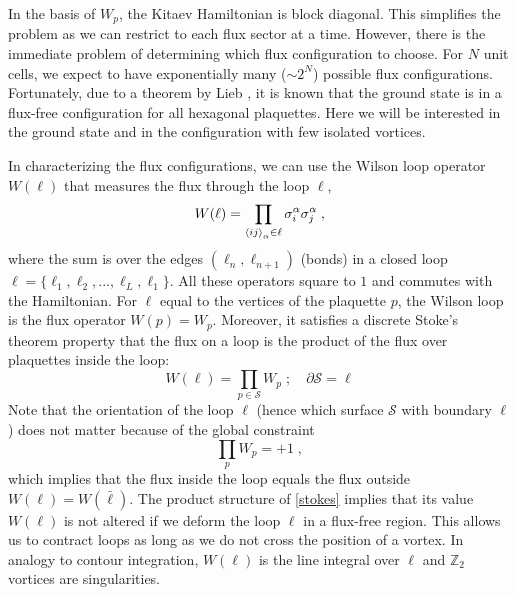
In the basis of $W_p$, the Kitaev Hamiltonian is block diagonal.
This simplifies the problem as we can restrict to each flux sector at a time.
However, there is the immediate problem of determining which flux configuration to choose. For $N$ unit cells, we expect to have exponentially many ($\sim2^N$)  possible flux configurations. Fortunately, due to a theorem by Lieb \cite{Lieb_1994}, it is known that the ground state is in a flux-free configuration for all hexagonal plaquettes.
Here we will be interested in the ground state and in the configuration with few isolated vortices.



In characterizing the flux configurations, we can use the Wilson loop operator $W(\ell)$ that measures the flux through the loop $\ell$,
\begin{equation}
    W(\ell) = \prod_{\braket{ij}_\alpha \in \ell } \sigma_i^\alpha \sigma_j^\alpha \; ,
\end{equation}
where the sum is over the edges $(\ell_n,\ell_{n+1}
)$ (bonds) in a closed loop $\ell=\{\ell_1,\ell_2,...,\ell_{L},\ell_1\}$.
All these operators square to $1$ and commutes with the Hamiltonian.
For $\ell$ equal to the vertices of the plaquette $p$, the Wilson loop is the flux operator $W(p)=W_p$. Moreover, it satisfies a discrete Stoke's theorem property that the flux on a loop is the product of the flux over plaquettes inside the loop:
\begin{equation}
    W(\ell) = \prod_{p \in \mathcal{S}} W_p \; ; \quad \partial \mathcal{S} = \ell  \label{stokes}
\end{equation}
Note that the orientation of the loop $\ell$ (hence which surface $\mathcal{S}$ with boundary $\ell$) does not matter because of the global constraint
\begin{equation}
    \prod_p W_p = +1 \; ,
\end{equation}
which implies that the flux inside the loop equals the flux outside $W(\ell)=W(\bar\ell)$. The product structure of  \eqref{stokes} implies that its value $ W(\ell)$ is not altered if we deform the loop $\ell$ in a flux-free region. This allows us to contract loops as long as we do not cross the position of a vortex. In analogy to contour integration, $W(\ell)$ is the line integral over $\ell$ and $\mathbb{Z}_2$ vortices are singularities.


